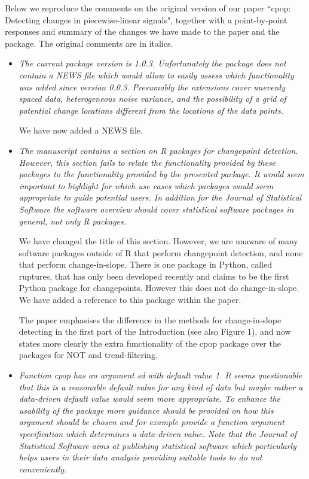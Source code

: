 \documentclass[12pt]{article}
\begin{document}
Below we reproduce the comments on the original version of our paper ``cpop: Detecting changes in piecewise-linear signals", together with a point-by-point responses and summary of the changes we have made to the paper and the package. The original comments are in italics.

\begin{itemize}
\item {\em The current package version is 1.0.3. Unfortunately the package does not contain a NEWS file which would allow to easily assess which functionality was added since version 0.0.3. Presumably the extensions cover unevenly spaced data, heterogeneous noise variance, and the possibility of a grid of potential change locations different from the locations of the data points.}

We have now added a NEWS file.

\item {\em The manuscript contains a section on R packages for changepoint detection. However, this section fails to relate the functionality provided by these packages to the functionality provided by the presented package. It would seem important to highlight for which use cases which packages would seem appropriate to guide potential users. In addition for the Journal of Statistical Software the software overview should cover statistical software packages in general, not only R packages.}

We have changed the title of this section. However, we are unaware of many software packages outside of R that perform changepoint detection, and none that perform change-in-slope. There is one package in Python, called ruptures, that has only been developed recently and claims to be the first Python package for changepoints. However this does not do change-in-slope. We have added a reference to this package within the paper. 

The paper emphasises the difference in the methods for change-in-slope detecting in the first part of the Introduction (see also Figure 1), and now states more clearly the extra functionality of the cpop package over the packages for NOT and trend-filtering.

\item {\em Function cpop has an argument sd with default value 1. It seems questionable that this is a reasonable default value for any kind of data but maybe rather a data-driven default value would seem more appropriate. To enhance the usability of the package more guidance should be provided on how this argument should be chosen and for example provide a function argument specification which determines a data-driven value. Note that the Journal of Statistical Software aims at publishing statistical software which particularly helps users in their data analysis providing suitable tools to do not conveniently.}


\end{itemize}
\end{document}
